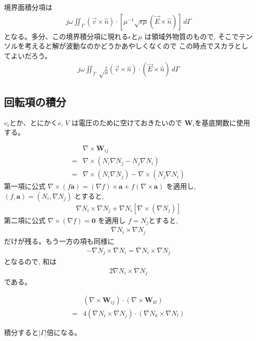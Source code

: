 境界面積分項は
\begin{align}
j\omega\iint_\Gamma
\left(\vec{v}\times\hat{n}\right)\cdot
\left[\mu^{-1}
\sqrt{\epsilon\mu}\left(\vec{E}\times\hat{n}\right)
\right]\,d\Gamma
\end{align}
となる。多分、この境界積分項に現れる$\epsilon$と$\mu$
は領域外物質のもので,
そこでテンソルを考えると解が波動なのかどうかあやしくなくので%
この時点でスカラとしてよいだろう。
\begin{align}
j\omega\iint_\Gamma\sqrt\frac{\epsilon}{\mu}
\left(\vec{v}\times\hat{n}\right)\cdot
\left(\vec{E}\times\hat{n}\right)
\,d\Gamma
\end{align}

\subsection{回転項の積分}

$v_i$とか、とにかく$v$, $V$
は電圧のために空けておきたいので
$\bm{W}_i$を基底関数に使用する。

\begin{align}
&\nabla\times\bm{W}_{ij}\\
=&\nabla\times\left(N_i\nabla N_j-N_j\nabla N_i\right)\\
=&\nabla\times\left(N_i\nabla N_j\right)
 -\nabla\times\left(N_j\nabla N_i\right)
\end{align}
第一項に公式
$\nabla\times\left(f\bm{a}\right)
=\left(\nabla f\right)\times\bm{a}
+f\left(\nabla\times\bm{a}\right)$
を適用し,
$\left(f, \bm{a}\right)
=\left(N_i, \nabla N_j\right)$
とすると,
\begin{align}
\nabla N_i\times\nabla N_j
+\nabla N_i\left[\nabla\times\left(\nabla N_j\right)\right]
\end{align}
第二項に公式
$\nabla\times\left(\nabla f\right)=\bm{0}$
を適用し
$f=N_j$とすると,
\begin{align}
\nabla N_i\times\nabla N_j
\end{align}
だけが残る。もう一方の項も同様に
\begin{align}
-\nabla N_j\times\nabla N_i = \nabla N_i\times\nabla N_j
\end{align}
となるので, 和は
\begin{align}
2\nabla N_i\times\nabla N_j
\end{align}
である。

\begin{align}
&\left(\nabla\times\bm{W}_{ij}\right)\cdot
\left(\nabla\times\bm{W}_{kl}\right)\\
=&4\left(\nabla N_i\times\nabla N_j\right)\cdot
   \left(\nabla N_k\times\nabla N_l\right)
\end{align}

積分すると$\left|\Gamma\right|$倍になる。